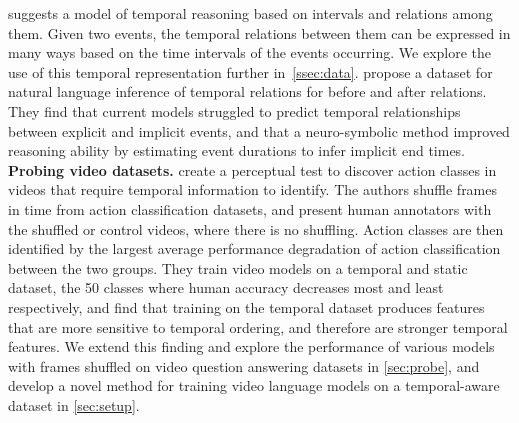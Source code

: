\citet{allen1983interval} suggests a model of temporal reasoning based on
intervals and relations among them. Given two events, the temporal relations
between them can be expressed in many ways based on the time intervals of the
events occurring. We explore the use of this temporal representation further
in~\cref{ssec:data}. \citet{zhou2021tracie} propose a dataset for natural
language inference of temporal relations for before and after relations. They
find that current models struggled to predict temporal relationships between
explicit and implicit events, and that a neuro-symbolic method improved 
reasoning ability by estimating event durations to infer implicit end times.\\



\noindent\textbf{Probing video datasets.}\hspace{0.2cm}
\citet{sevilla-lara2021temporal} create a perceptual test to discover action
classes in videos that require temporal information to identify. The authors
shuffle frames in time from action classification datasets, and present human
annotators with the shuffled or control videos, where there is no shuffling.
Action classes are then identified by the largest average performance
degradation of action classification between the two groups. They train video
models on a temporal and static dataset, the 50 classes where human accuracy
decreases most and least respectively, and find that training on the temporal
dataset produces features that are more sensitive to temporal ordering, and
therefore are stronger temporal features.
We extend this finding and explore the performance of various models with
frames shuffled on video question answering datasets in \cref{sec:probe}, and
develop a novel method for training video language models on a temporal-aware
dataset in \cref{sec:setup}.

%
%
%
%

